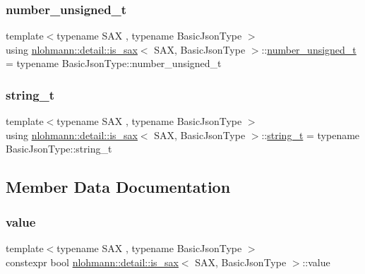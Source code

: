 \subsubsection{\texorpdfstring{number\+\_\+unsigned\+\_\+t}{number\_unsigned\_t}}
{\footnotesize\ttfamily template$<$typename S\+AX , typename Basic\+Json\+Type $>$ \\
using \hyperlink{structnlohmann_1_1detail_1_1is__sax}{nlohmann\+::detail\+::is\+\_\+sax}$<$ S\+AX, Basic\+Json\+Type $>$\+::\hyperlink{structnlohmann_1_1detail_1_1is__sax_a655c9b8038e51e5b9211e2419118644d}{number\+\_\+unsigned\+\_\+t} =  typename Basic\+Json\+Type\+::number\+\_\+unsigned\+\_\+t\hspace{0.3cm}{\ttfamily [private]}}

\mbox{\label{structnlohmann_1_1detail_1_1is__sax_ad8e2e1427ff43536370b6db6ab83ae50}} 
\subsubsection{\texorpdfstring{string\+\_\+t}{string\_t}}
{\footnotesize\ttfamily template$<$typename S\+AX , typename Basic\+Json\+Type $>$ \\
using \hyperlink{structnlohmann_1_1detail_1_1is__sax}{nlohmann\+::detail\+::is\+\_\+sax}$<$ S\+AX, Basic\+Json\+Type $>$\+::\hyperlink{structnlohmann_1_1detail_1_1is__sax_ad8e2e1427ff43536370b6db6ab83ae50}{string\+\_\+t} =  typename Basic\+Json\+Type\+::string\+\_\+t\hspace{0.3cm}{\ttfamily [private]}}



\subsection{Member Data Documentation}
\mbox{\label{structnlohmann_1_1detail_1_1is__sax_a8ab7e51087000e948b4a2492257484dc}} 
\subsubsection{\texorpdfstring{value}{value}}
{\footnotesize\ttfamily template$<$typename S\+AX , typename Basic\+Json\+Type $>$ \\
constexpr bool \hyperlink{structnlohmann_1_1detail_1_1is__sax}{nlohmann\+::detail\+::is\+\_\+sax}$<$ S\+AX, Basic\+Json\+Type $>$\+::value\hspace{0.3cm}{\ttfamily [static]}}

